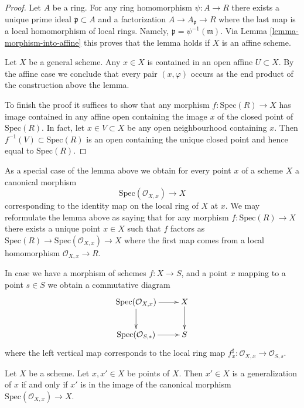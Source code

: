 \begin{proof}
Let $A$ be a ring. For any ring homomorphism $\psi : A \to R$
there exists a unique prime ideal $\mathfrak p \subset A$
and a factorization $A \to A_{\mathfrak p} \to R$ where the
last map is a local homomorphism of local rings. Namely,
$\mathfrak p = \psi^{-1}(\mathfrak m)$. Via
Lemma \ref{lemma-morphism-into-affine}
this proves that the lemma holds if $X$ is an affine scheme.

\medskip\noindent
Let $X$ be a general scheme. Any $x \in X$ is contained in
an open affine $U \subset X$. By the affine case we conclude that every pair
$(x, \varphi)$ occurs as the end product of the construction
above the lemma.

\medskip\noindent
To finish the proof it suffices to show that any morphism
$f : \text{Spec}(R) \to X$ has image contained in any affine
open containing the image $x$ of the closed
point of $\text{Spec}(R)$. In fact, let $x \in V \subset X$
be any open neighbourhood containing $x$. Then
$f^{-1}(V) \subset \text{Spec}(R)$ is an open containing
the unique closed point and hence equal to $\text{Spec}(R)$.
\end{proof}

\noindent
As a special case of the lemma above we obtain for every
point $x$ of a scheme $X$ a canonical morphism
$$
\text{Spec}(\mathcal{O}_{X, x}) \longrightarrow X
$$
corresponding to the identity map on the local ring of $X$ at $x$.
We may reformulate the lemma above as saying that for any
morphism $f : \text{Spec}(R) \to X$ there exists a unique point
$x \in X$ such that $f$ factors as
$\text{Spec}(R) \to \text{Spec}(\mathcal{O}_{X, x}) \to X$
where the first map comes from a local homomorphism
$\mathcal{O}_{X, x} \to R$.

\medskip\noindent
In case we have a morphism of schemes $f : X \to S$,
and a point $x$ mapping to a point $s \in S$ we obtain
a commutative diagram
$$
\xymatrix{
\text{Spec}(\mathcal{O}_{X, x}) \ar[r] \ar[d] & X \ar[d] \\
\text{Spec}(\mathcal{O}_{S, s}) \ar[r] & S
}
$$
where the left vertical map corresponds to the local ring map
$f^\sharp_x : \mathcal{O}_{X, x} \to \mathcal{O}_{S, s}$.

\begin{lemma}
\label{lemma-specialize-points}
Let $X$ be a scheme.
Let $x, x' \in X$ be points of $X$.
Then $x' \in X$ is a generalization of $x$ if and only if
$x'$ is in the image of the canonical morphism
$\text{Spec}(\mathcal{O}_{X, x}) \to X$.
\end{lemma}

